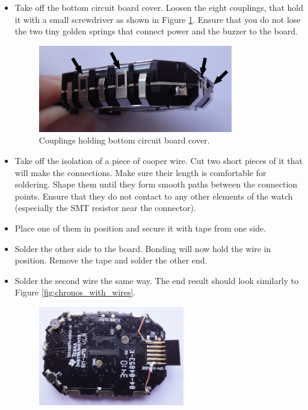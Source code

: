 \begin{itemize}
  \item Take off the bottom circuit board cover. Loosen the eight
    couplings, that hold it with a small screwdriver as shown in
    Figure \ref{fig:chronos_cover_off}. Ensure that you do not lose the two
    tiny golden springs that connect power and the buzzer to the board.
    \begin{figure}[h]
      \centering
      \includegraphics[width=0.8\textwidth]{img/chronos_cover_off.jpg}
      \caption{Couplings holding bottom circuit board cover.}
      \label{fig:chronos_cover_off}
    \end{figure}
  \item Take off the isolation of a piece of cooper wire. Cut two
    short pieces of it that will make the connections.  Make sure
    their length is comfortable for soldering. Shape them until they
    form smooth paths between the connection points. Ensure that they
    do not contact to any other elements of the watch (especially the SMT resistor
    near the connector).
  \item Place one of them in position and secure it with tape
    from one side.
  \item Solder the other side to the board. Bonding will now hold the
    wire in position. Remove the tape and solder the other end.
  \item Solder the second wire the same way. The end result should
    look similarly to Figure \ref{fig:chronos_with_wires}.
    \begin{figure}[h]
      \centering
      \includegraphics[width=0.6\textwidth]{img/chronos_with_wires.jpg}

\end{figure}
\end{itemize}
